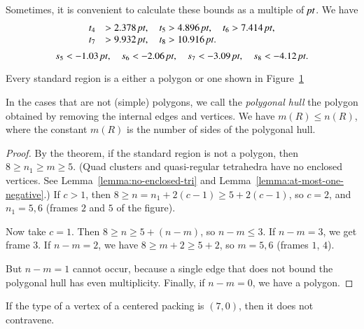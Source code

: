 Sometimes, it is convenient to calculate these bounds as a multiple
of $\hbox{\it pt}$.  We have
    $$
    \begin{array}{lll}
    t_4&>2.378\,\hbox{\it pt},\quad t_5>4.896\,\hbox{\it pt},\quad
    t_6>7.414\,\hbox{\it pt},\\
    t_7&>9.932\,\hbox{\it pt},\quad
    t_8>10.916\,\hbox{\it pt}.
    \end{array}
    $$
    $$
    s_5 < -1.03\,\hbox{\it pt},\quad s_6<-2.06\,\hbox{\it pt},\quad
    s_7<-3.09\,\hbox{\it pt},\quad s_8<-4.12\,\hbox{\it pt}.
    $$




\begin{corollary}
    \label{cor:std-aggregate-list}
Every standard region is a either a polygon or one shown in
Figure~\ref{fig:std-aggregates}
\end{corollary}



\begin{figure}[htb]
  \centering
  \caption{}
  \label{fig:std-aggregates}
\end{figure}


In the cases that are not (simple) polygons, we call the {\it polygonal
hull\/} the polygon obtained by removing the internal edges and
vertices. We have $m(R)\le n(R)$, where the constant $m(R)$ is the
number of sides of the polygonal hull.

\begin{proof}
By the theorem, if the standard region is not a polygon, then $8\ge
n_1\ge m\ge 5$. (Quad clusters and quasi-regular tetrahedra have no
enclosed vertices. See Lemma~\ref{lemma:no-enclosed-tri} and
Lemma~\ref{lemma:at-most-one-negative}.) If $c>1$, then $8\ge
n=n_1+2(c-1)\ge 5+2(c-1)$, so $c=2$, and $n_1=5,6$ (frames $2$ and $5$
of the figure).

Now take $c=1$.    Then $8\ge n\ge 5+(n-m)$, so $n-m\le 3$.  If $n-m=3$,
we get frame $3$. If $n-m=2$, we have $8\ge m+2\ge 5+2$, so $m=5,6$
(frames $1$, $4$).

But $n-m=1$ cannot occur, because a single edge that does not bound the
polygonal hull has even multiplicity.  Finally, if $n-m=0$, we have a
polygon.
\end{proof}

\begin{corollary} \label{lemma:70}
If the type of a vertex of a centered packing is $(7,0)$, then it
does not contravene.
\end{corollary}

